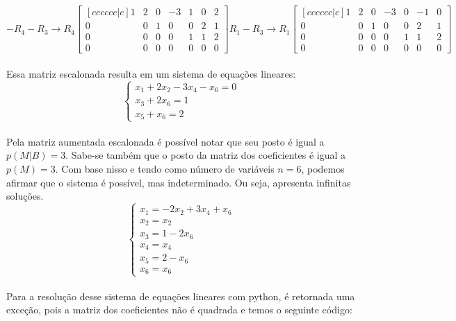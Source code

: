 \[
    -R_4-R_3\to R_4
    \begin{bmatrix}[cccccc|c]
        1 & 2 & 0 & -3 & 1 & 0 & 2 \\
        0 & 0 & 1 & 0  & 0 & 2 & 1 \\
        0 & 0 & 0 & 0  & 1 & 1 & 2 \\
        0 & 0 & 0 & 0  & 0 & 0 & 0
    \end{bmatrix}
    R_1-R_3\to R_1
    \begin{bmatrix}[cccccc|c]
        1 & 2 & 0 & -3 & 0 & -1 & 0 \\
        0 & 0 & 1 & 0  & 0 & 2  & 1 \\
        0 & 0 & 0 & 0  & 1 & 1  & 2 \\
        0 & 0 & 0 & 0  & 0 & 0  & 0
    \end{bmatrix}
\]
\\

Essa matriz escalonada resulta em um sistema de equações lineares:
\\

\[
    \begin{cases}
        x_1 +2x_2  -3x_4 -x_6  = 0 \\
        x_3  +2x_6 = 1             \\
        x_5 +x_6 = 2
    \end{cases}
\]
\\

Pela matriz aumentada escalonada é possível notar que seu posto é igual a $p(M|B)=3$. Sabe-se também que o posto da matriz dos coeficientes é igual a $p(M)=3$. Com base nisso e tendo como número de variáveis $n=6$, podemos afirmar que o sistema é possível, mas indeterminado. Ou seja, apresenta infinitas soluções.\\

\begin{equation}
    \begin{cases}
        x_1=-2x_2+3 x_4+x_6 \\
        x_2=x_2             \\
        x_3=1-2x_6          \\
        x_4=x_4             \\
        x_5=2-x_6           \\
        x_6=x_6
    \end{cases}
\end{equation}
\\

Para a resolução desse sistema de equações lineares com python, é retornada uma exceção, pois a matriz dos coeficientes não é quadrada e temos o seguinte código:
\\

